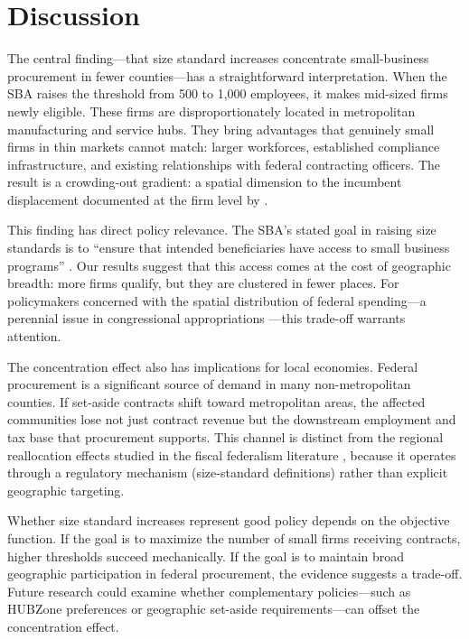 \documentclass[12pt]{article}
\begin{document}
\section{Discussion}

The central finding---that size standard increases concentrate small-business procurement in fewer counties---has a straightforward interpretation. When the SBA raises the threshold from 500 to 1,000 employees, it makes mid-sized firms newly eligible. These firms are disproportionately located in metropolitan manufacturing and service hubs. They bring advantages that genuinely small firms in thin markets cannot match: larger workforces, established compliance infrastructure, and existing relationships with federal contracting officers. The result is a crowding-out gradient: a spatial dimension to the incumbent displacement documented at the firm level by \citet{denes2024}.

This finding has direct policy relevance. The SBA's stated goal in raising size standards is to ``ensure that intended beneficiaries have access to small business programs'' \citep{sba2014methodology}. Our results suggest that this access comes at the cost of geographic breadth: more firms qualify, but they are clustered in fewer places. For policymakers concerned with the spatial distribution of federal spending---a perennial issue in congressional appropriations \citep{berry2010, knight2005}---this trade-off warrants attention.

The concentration effect also has implications for local economies. Federal procurement is a significant source of demand in many non-metropolitan counties. If set-aside contracts shift toward metropolitan areas, the affected communities lose not just contract revenue but the downstream employment and tax base that procurement supports. This channel is distinct from the regional reallocation effects studied in the fiscal federalism literature \citep{suarez2016, chodorow2019}, because it operates through a regulatory mechanism (size-standard definitions) rather than explicit geographic targeting.

Whether size standard increases represent good policy depends on the objective function. If the goal is to maximize the number of small firms receiving contracts, higher thresholds succeed mechanically. If the goal is to maintain broad geographic participation in federal procurement, the evidence suggests a trade-off. Future research could examine whether complementary policies---such as HUBZone preferences or geographic set-aside requirements---can offset the concentration effect.
\end{document}
